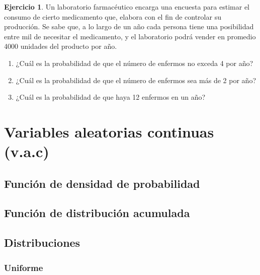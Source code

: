 \documentclass[
]{book}
\providecommand{\tightlist}{%
  \setlength{\itemsep}{0pt}\setlength{\parskip}{0pt}}
\theoremstyle{definition}
\theoremstyle{definition}
\theoremstyle{definition}
\newtheorem{exercise}{Ejercicio}[chapter]
\theoremstyle{definition}
\theoremstyle{remark}
\begin{document}
\begin{exercise}

Un laboratorio farmacéutico encarga una encuesta para estimar el consumo de cierto medicamento que, elabora con el fin de controlar su producción. Se sabe que, a lo largo de un año cada persona tiene una posibilidad entre mil de necesitar el medicamento, y el laboratorio podrá vender en promedio 4000 unidades del producto por año.

\begin{enumerate}
\def\labelenumi{\arabic{enumi}.}
\tightlist
\item
  ¿Cuál es la probabilidad de que el número de enfermos no exceda 4 por año?
\item
  ¿Cuál es la probabilidad de que el número de enfermos sea más de 2 por año?
\item
  ¿Cuál es la probabilidad de que haya 12 enfermos en un año?
\end{enumerate}

\end{exercise}

\hypertarget{variables-aleatorias-continuas-v.a.c}{%
\section{Variables aleatorias continuas (v.a.c)}\label{variables-aleatorias-continuas-v.a.c}}

\hypertarget{funciuxf3n-de-densidad-de-probabilidad}{%
\subsection{Función de densidad de probabilidad}\label{funciuxf3n-de-densidad-de-probabilidad}}

\hypertarget{funciuxf3n-de-distribuciuxf3n-acumulada-1}{%
\subsection{Función de distribución acumulada}\label{funciuxf3n-de-distribuciuxf3n-acumulada-1}}

\hypertarget{distribuciones-1}{%
\subsection{Distribuciones}\label{distribuciones-1}}

\hypertarget{uniforme-1}{%
\subsubsection*{Uniforme}\label{uniforme-1}}
\end{document}
